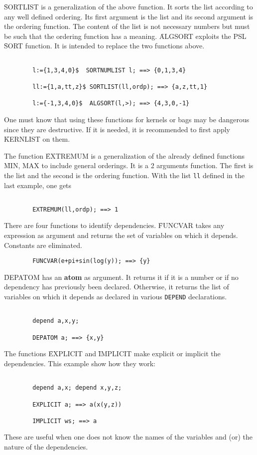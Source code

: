 \f{SORTLIST} is a generalization of the above function.
It sorts the list according
to any well defined ordering. Its first argument is the list and its
second argument is the ordering function. The content of the list
is not necessary numbers but must be such that the ordering function has
a meaning.
\f{ALGSORT} exploits the PSL \f{SORT} function. It is intended to replace
the two functions above.
\begin{verbatim}

        l:={1,3,4,0}$  SORTNUMLIST l; ==> {0,1,3,4}

        ll:={1,a,tt,z}$ SORTLIST(ll,ordp); ==> {a,z,tt,1}

        l:={-1,3,4,0}$  ALGSORT(l,>); ==> {4,3,0,-1}

\end{verbatim}
One must know that using these functions for kernels or bags may be
dangerous since they are destructive. If it is needed, it is recommended
to first apply \f{KERNLIST} on them.

The function \f{EXTREMUM} is a generalization of the already defined functions
\f{MIN, MAX} to include general orderings. It is a 2 arguments function.
The first is the list and the second is the ordering function.
With the list \verb+ll+ defined in the last example, one gets
\begin{verbatim}

        EXTREMUM(ll,ordp); ==> 1

\end{verbatim}
\item[iii.] There are four functions to identify dependencies.
\f{FUNCVAR} takes any expression as argument and returns the set of
variables on which it depends. Constants are eliminated.
\begin{verbatim}
        FUNCVAR(e+pi+sin(log(y)); ==> {y}
\end{verbatim}
\f{DEPATOM} has an {\bf atom} as argument. It returns it if it is
a number or if no dependency has previously been declared. Otherwise,
it returns the list of variables on which it depends as declared in various
{\tt DEPEND} declarations.
\begin{verbatim}

        depend a,x,y;

        DEPATOM a; ==> {x,y}

\end{verbatim}
The functions \f{EXPLICIT} and \f{IMPLICIT} make explicit or
implicit the dependencies. This example show how they work:
\begin{verbatim}

        depend a,x; depend x,y,z;

        EXPLICIT a; ==> a(x(y,z))

        IMPLICIT ws; ==> a

\end{verbatim}
These are useful when one does not know the names of the variables
 and (or) the nature of the dependencies.

